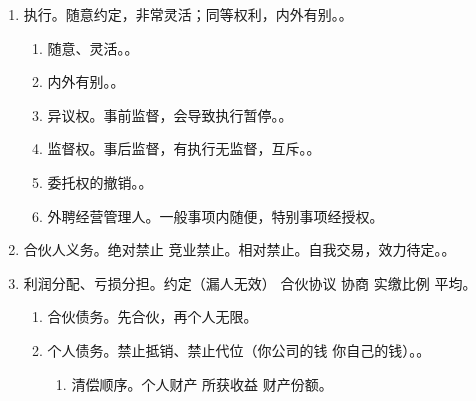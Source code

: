 \begin{enumerate}
\begin{enumerate}
          \item 特别事项（破坏人合性 + 风险大）。一致同意。基本都涉及人和钱。我范、保、协、地、人、名、菜。
                \begin{enumerate}
                  \item 改名、变更经营范围、营业地点、合伙协议。。
                  \item 处分财产。不动产、知识产权、财产份额。。
                  \item 聘任管理人、吸收新合伙人。
                  \item 提供担保、自我交易。\sjt 搞些容易迷惑人的选项。
                \end{enumerate}
        \end{enumerate}
  \item 执行。随意约定，非常灵活；同等权利，内外有别。。
        \begin{enumerate}
          \item 随意、灵活。。
          \item 内外有别。。
          \item 异议权。事前监督，会导致执行暂停。。
          \item 监督权。事后监督，有执行无监督，互斥。。
          \item 委托权的撤销。。
          \item 外聘经营管理人。一般事项内随便，特别事项经授权。
        \end{enumerate}
  \item 合伙人义务。\yi 绝对禁止 \yjt 竞业禁止。\er 相对禁止。自我交易，效力待定。。
  \item 利润分配、亏损分担。约定（漏人无效） \dy 合伙协议 \dy 协商 \dy 实缴比例 \dy 平均。
        \begin{enumerate}
          \item 合伙债务。先合伙，再个人无限。
          \item 个人债务。禁止抵销、禁止代位（你公司的钱 \bdy 你自己的钱）。。
                \begin{enumerate}
                  \item 清偿顺序。个人财产 \yjt 所获收益 \yjt 财产份额。

\end{enumerate}
\end{enumerate}
\end{enumerate}
